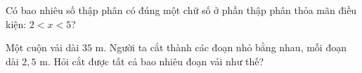 \begin{ex} %
Có bao nhiêu số thập phân có đúng một chữ số ở phần thập phân thỏa mãn điều kiện: $2 < x < 5$?
\end{ex}

\begin{ex} %
Một cuộn vải dài $35\text{ m}$. Người ta cắt thành các đoạn nhỏ bằng nhau, mỗi đoạn dài $2{,}5\text{ m}$. Hỏi cắt được tất cả bao nhiêu đoạn vải như thế?
\end{ex}

